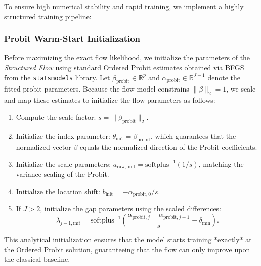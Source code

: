 \documentclass{article}
\numberwithin{figure}{section}
\numberwithin{table}{section}
\numberwithin{equation}{section}
\begin{document}
To ensure high numerical stability and rapid training, we implement a highly structured training pipeline:

\subsubsection{Probit Warm-Start Initialization}
Before maximizing the exact flow likelihood, we initialize the parameters of the \textit{Structured Flow} using standard Ordered Probit estimates obtained via BFGS from the \texttt{statsmodels} library. Let $\beta_{\text{probit}} \in \mathbb{R}^p$ and $\alpha_{\text{probit}} \in \mathbb{R}^{J-1}$ denote the fitted probit parameters. Because the flow model constrains $\|\beta\|_2 = 1$, we scale and map these estimates to initialize the flow parameters as follows:
\begin{enumerate}
    \item Compute the scale factor: $s = \|\beta_{\text{probit}}\|_2$.
    \item Initialize the index parameter: $\theta_{\text{init}} = \beta_{\text{probit}}$, which guarantees that the normalized vector $\beta$ equals the normalized direction of the Probit coefficients.
    \item Initialize the scale parameters: $a_{\text{raw, init}} = \text{softplus}^{-1}(1/s)$, matching the variance scaling of the Probit.
    \item Initialize the location shift: $b_{\text{init}} = -\alpha_{\text{probit}, 0}/s$.
    \item If $J > 2$, initialize the gap parameters using the scaled differences: 
    \begin{equation}
    \lambda_{j-1, \text{init}} = \text{softplus}^{-1}\left( \frac{\alpha_{\text{probit}, j} - \alpha_{\text{probit}, j-1}}{s} - \delta_{\text{min}} \right).
    \end{equation}
\end{enumerate}
This analytical initialization ensures that the model starts training *exactly* at the Ordered Probit solution, guaranteeing that the flow can only improve upon the classical baseline.
\end{document}
